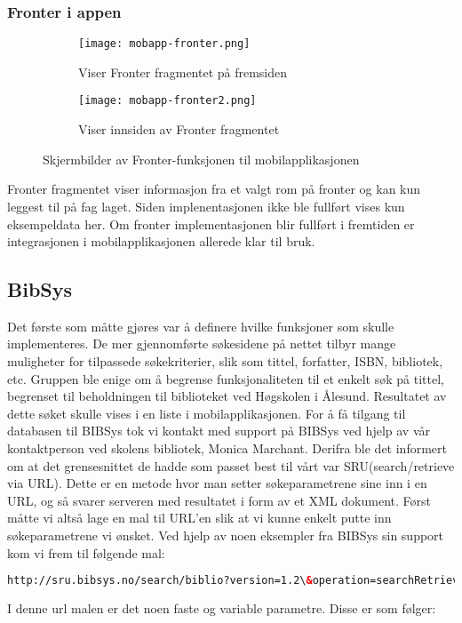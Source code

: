 \documentclass[../main.tex]{subfiles}
\begin{document}
\subsubsection{Fronter i appen}

\begin{figure}[H]
        \centering
        \begin{subfigure}[b]{0.3\textwidth}
                \centering
                \texttt{[image: mobapp-fronter.png]}
                \caption{Viser Fronter fragmentet på fremsiden}
        \end{subfigure}
        \quad
        \begin{subfigure}[b]{0.3\textwidth}
                \centering
                \texttt{[image: mobapp-fronter2.png]}
                \caption{Viser innsiden av Fronter fragmentet}
        \end{subfigure}
        \caption{Skjermbilder av Fronter-funksjonen til mobilapplikasjonen}
\end{figure}

Fronter fragmentet viser informasjon fra et valgt rom på fronter og kan kun leggest til på fag laget. Siden implenentasjonen ikke ble fullført vises kun eksempeldata her. Om fronter implementasjonen blir fullført i fremtiden er integrasjonen i mobilapplikasjonen allerede klar til bruk. 

\subsection{BibSys}

Det første som måtte gjøres var å definere hvilke funksjoner som skulle implementeres. De mer gjennomførte søkesidene på nettet tilbyr mange muligheter for tilpassede søkekriterier, slik som tittel, forfatter, ISBN, bibliotek, etc.  Gruppen ble enige om å begrense funksjonaliteten til et enkelt søk på tittel, begrenset til beholdningen til biblioteket ved Høgskolen i Ålesund. Resultatet av dette søket skulle vises i en liste i mobilapplikasjonen.\newline
\newline
For å få tilgang til databasen til BIBSys tok vi kontakt med support på BIBSys ved hjelp av vår kontaktperson ved skolens bibliotek, Monica Marchant. Derifra ble det informert om at det grensesnittet de hadde som passet best til vårt var SRU(search/retrieve via URL). Dette er en metode hvor man setter søkeparametrene sine inn i en URL, og så svarer serveren med resultatet i form av et XML dokument.
\newline
Først måtte vi altså lage en mal til URL’en slik at vi kunne enkelt putte inn søkeparametrene vi ønsket. Ved hjelp av noen eksempler fra BIBSys sin support kom vi frem til følgende mal:
\newline
\begin{lstlisting}[language=HTML, frame=single]
http://sru.bibsys.no/search/biblio?version=1.2\&operation=searchRetrieve\&startRecord=1\&maximumRecords=10\&query=bs.bibkode=xb\%20AND\%20bs.tittel=ibsen
\end{lstlisting}
I denne url malen er det noen faste og variable parametre. Disse er som følger:
\end{document}
